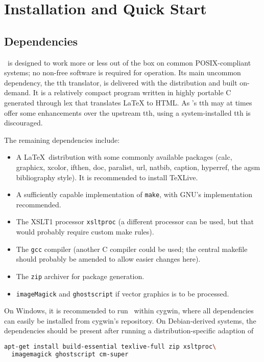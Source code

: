 \documentclass[11pt,a4paper]{ivoa}
\begin{document}
\section{Installation and Quick Start}
\label{sect:quick}

\subsection{Dependencies}

\ivoatex\ is designed to work more or less out of the box on common
POSIX-compliant systems; no non-free software is required for operation.
Its main uncommon dependency, the tth translator, is delivered with the
distribution and built on-demand. It is a relatively compact program
written in highly portable C generated through lex that translates LaTeX
to HTML.
As \ivoatex's tth may at times offer
some enhancements over the upstream tth, using a system-installed tth is
discouraged.

The remaining dependencies include:

\begin{itemize}
\item A \LaTeX\ distribution with some commonly available packages (calc,
graphicx, xcolor, ifthen, doc, paralist, url, natbib, caption, hyperref,
the agsm bibliography style).  It is recommended to install TeXLive.
\item A sufficiently capable implementation of \texttt{make}, with GNU's
implementation recommended.
\item The XSLT1 processor \texttt{xsltproc} (a different processor can
be used, but that would probably require custom make rules).
\item The \texttt{gcc} compiler (another C compiler could be used; the
central makefile should probably be amended to allow easier changes
here).
\item The \texttt{zip} archiver for package generation.
\item \texttt{imageMagick} and \texttt{ghostscript} if vector graphics
is to be processed.
\end{itemize}

On Windows, it is recommended to run \ivoatex\ within cygwin, where all
dependencies can easily be installed from cygwin's repository.  On
Debian-derived systems, the dependencies should be present after
running a distribution-specific adaption of

\begin{lstlisting}[language=sh]
apt-get install build-essential texlive-full zip xsltproc\
  imagemagick ghostscript cm-super
\end{lstlisting}
\end{document}
